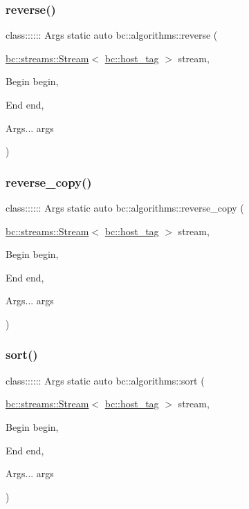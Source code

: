\mbox{\label{namespacebc_1_1algorithms_abb783ac679bb0f75ee3a5ec7defed717}} 
\subsubsection{\texorpdfstring{reverse()}{reverse()}}
{\footnotesize\ttfamily class\+:::::: Args static auto bc\+::algorithms\+::reverse (\begin{DoxyParamCaption}\item[{\hyperlink{classbc_1_1streams_1_1Stream}{bc\+::streams\+::\+Stream}$<$ \hyperlink{structbc_1_1host__tag}{bc\+::host\+\_\+tag} $>$}]{stream,  }\item[{Begin}]{begin,  }\item[{End}]{end,  }\item[{Args...}]{args }\end{DoxyParamCaption})}

\mbox{\label{namespacebc_1_1algorithms_a3a74918fac3854d0a24a5052f58d7d01}} 
\subsubsection{\texorpdfstring{reverse\+\_\+copy()}{reverse\_copy()}}
{\footnotesize\ttfamily class\+:::::: Args static auto bc\+::algorithms\+::reverse\+\_\+copy (\begin{DoxyParamCaption}\item[{\hyperlink{classbc_1_1streams_1_1Stream}{bc\+::streams\+::\+Stream}$<$ \hyperlink{structbc_1_1host__tag}{bc\+::host\+\_\+tag} $>$}]{stream,  }\item[{Begin}]{begin,  }\item[{End}]{end,  }\item[{Args...}]{args }\end{DoxyParamCaption})}

\mbox{\label{namespacebc_1_1algorithms_ace8c8eef42a9a58eb05722b682f38f69}} 
\subsubsection{\texorpdfstring{sort()}{sort()}}
{\footnotesize\ttfamily class\+:::::: Args static auto bc\+::algorithms\+::sort (\begin{DoxyParamCaption}\item[{\hyperlink{classbc_1_1streams_1_1Stream}{bc\+::streams\+::\+Stream}$<$ \hyperlink{structbc_1_1host__tag}{bc\+::host\+\_\+tag} $>$}]{stream,  }\item[{Begin}]{begin,  }\item[{End}]{end,  }\item[{Args...}]{args }\end{DoxyParamCaption})}

